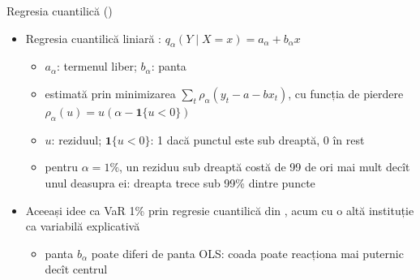 \begin{frame}{Regresia cuantilică ()}
\itemsize{\small}
\begin{itemize}
    \item Regresia cuantilică liniară : $q_\alpha(Y \mid X = x) = a_\alpha + b_\alpha x$
    \begin{itemize}
        \item $a_\alpha$: termenul liber; $b_\alpha$: panta
        \item estimată prin minimizarea $\sum_t \rho_\alpha(y_t - a - bx_t)$, cu funcția de pierdere $\rho_\alpha(u) = u(\alpha - \mathbf{1}\{u < 0\})$
        \item $u$: reziduul; $\mathbf{1}\{u < 0\}$: 1 dacă punctul este sub dreaptă, 0 în rest
        \item pentru $\alpha = 1\%$, un reziduu sub dreaptă costă de 99 de ori mai mult decît unul deasupra ei: dreapta trece sub 99\% dintre puncte
    \end{itemize}
    \item Aceeași idee ca VaR 1\% prin regresie cuantilică din , acum cu o altă instituție ca variabilă explicativă
    \begin{itemize}
        \item panta $b_\alpha$ poate diferi de panta OLS: coada poate reacționa mai puternic decît centrul
    \end{itemize}
\end{itemize}
\end{frame}

